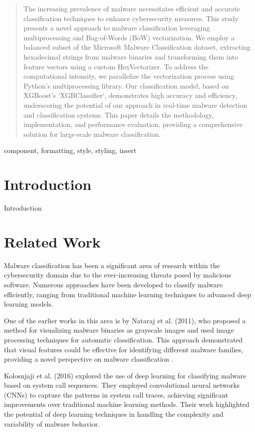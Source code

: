 \documentclass[conference]{IEEEtran}
\begin{document}
\begin{abstract}
    The increasing prevalence of malware necessitates efficient and accurate classification techniques to enhance cybersecurity measures. This study presents a novel approach to malware classification leveraging multiprocessing and Bag-of-Words (BoW) vectorization. We employ a balanced subset of the Microsoft Malware Classification dataset, extracting hexadecimal strings from malware binaries and transforming them into feature vectors using a custom HexVectorizer. To address the computational intensity, we parallelize the vectorization process using Python’s multiprocessing library. Our classification model, based on XGBoost’s `XGBClassifier`, demonstrates high accuracy and efficiency, underscoring the potential of our approach in real-time malware detection and classification systems. This paper details the methodology, implementation, and performance evaluation, providing a comprehensive solution for large-scale malware classification.
\end{abstract}

\begin{IEEEkeywords}
component, formatting, style, styling, insert
\end{IEEEkeywords}

\section{Introduction}
Introduction

\section{Related Work}
Malware classification has been a significant area of research within the cybersecurity domain due to the ever-increasing threats posed by malicious software. Numerous approaches have been developed to classify malware efficiently, ranging from traditional machine learning techniques to advanced deep learning models.

One of the earlier works in this area is by Nataraj et al. (2011), who proposed a method for visualizing malware binaries as grayscale images and used image processing techniques for automatic classification. This approach demonstrated that visual features could be effective for identifying different malware families, providing a novel perspective on malware classification .

Kolosnjaji et al. (2016) explored the use of deep learning for classifying malware based on system call sequences. They employed convolutional neural networks (CNNs) to capture the patterns in system call traces, achieving significant improvements over traditional machine learning methods. Their work highlighted the potential of deep learning techniques in handling the complexity and variability of malware behavior.
\end{document}
